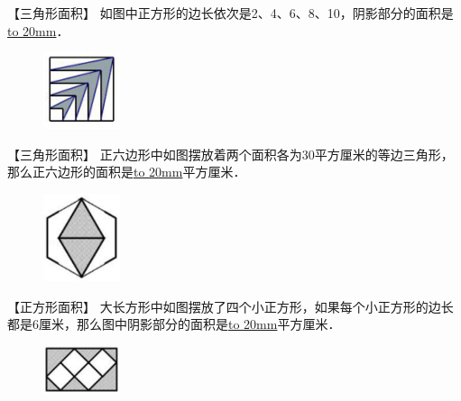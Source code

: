 \item {
    【三角形面积】
    如图中正方形的边长依次是2、4、6、8、10，阴影部分的面积是\underline{\hbox to 20mm{}}．
    \begin{figure}[H] 
        \centering
        \includegraphics[width=0.2\textwidth]{./pics/Chapter_3/17.png}
    \end{figure}
    \vspace{1cm}
}

\item {
    【三角形面积】
    正六边形中如图摆放着两个面积各为30平方厘米的等边三角形，那么正六边形的面积是\underline{\hbox to 20mm{}}平方厘米．
    \begin{figure}[H] 
        \centering
        \includegraphics[width=0.2\textwidth]{./pics/Chapter_3/18.png}
    \end{figure}
    \vspace{1cm}
}

\item {
    【正方形面积】
    大长方形中如图摆放了四个小正方形，如果每个小正方形的边长都是6厘米，那么图中阴影部分的面积是\underline{\hbox to 20mm{}}平方厘米．
    \begin{figure}[H] 
        \centering
        \includegraphics[width=0.2\textwidth]{./pics/Chapter_3/19.png}
    \end{figure}
    \vspace{1cm}
}

